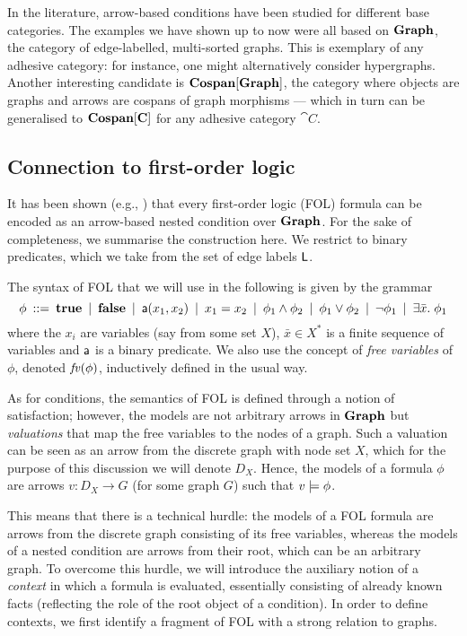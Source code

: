 In the literature, arrow-based conditions have been studied for different base categories. The examples we have shown up to now were all based on $\textbf{Graph}$, the category of edge-labelled, multi-sorted graphs. This is exemplary of any adhesive category: for instance, one might alternatively consider hypergraphs. Another interesting candidate is $\textbf{Cospan}[\textbf{Graph}]$, the category where objects are graphs and arrows are cospans of graph morphisms --- which in turn can be generalised to $\textbf{Cospan}[\textbf{C}]$ for any adhesive category $\cat C$.

\subsection{Connection to first-order logic}

It has been shown (e.g., \cite{Rensink-FOL,Habel-FOL}) that every first-order logic (FOL) formula can be encoded as an arrow-based nested condition over $\textbf{Graph}$. For the sake of completeness, we summarise the construction here. We restrict to binary predicates, which we take from the set of edge labels $\mathsf{L}$.

The syntax of FOL that we will use in the following is given by the grammar
%
\[ \phi \:::=\: \textbf{true}
        \:\mid\: \textbf{false}
		\:\mid\: \mathsf{a}(x_1,x_2)
        \:\mid\: x_1=x_2
		\:\mid\: \phi_1\wedge \phi_2
		\:\mid\: \phi_1\vee \phi_2
		\:\mid\: \neg\phi_1
		\:\mid\: \exists \bar x.\; \phi_1 
		\]
where the $x_i$ are variables (say from some set $X$), $\bar x\in X^*$ is a finite sequence of variables and $\mathsf{a}$ is a binary predicate. We also use the concept of \emph{free variables} of $\phi$, denoted $\mathit{fv}(\phi)$, inductively defined in the usual way.

As for conditions, the semantics of FOL is defined through a notion of satisfaction; however, the models are not arbitrary arrows in $\textbf{Graph}$ but \emph{valuations} that map the free variables to the nodes of a graph. Such a valuation can be seen as an arrow from the discrete graph with node set $X$, which for the purpose of this discussion we will denote $D_X$. Hence, the models of a formula $\phi$ are arrows $v:D_X\to G$ (for some graph $G$) such that $v\models\phi$.

This means that there is a technical hurdle: the models of a FOL formula are arrows from the discrete graph consisting of its free variables, whereas the models of a nested condition are arrows from their root, which can be an arbitrary graph. To overcome this hurdle, we will introduce the auxiliary notion of a \emph{context} in which a formula is evaluated, essentially consisting of already known facts (reflecting the role of the root object of a condition). In order to define contexts, we first identify a fragment of FOL with a strong relation to graphs.


